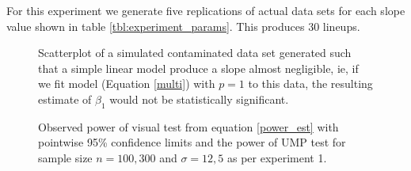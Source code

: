 \documentclass{article}
\begin{document}
For this experiment we generate five replications of actual data sets for each slope value shown in table \ref{tbl:experiment_params}. This produces 30 lineups.

\begin{figure}[hbt]
   \centering
       \caption{Scatterplot of a simulated contaminated data set generated such that a simple linear model produce a slope almost negligible, ie, if we fit model (Equation \eqref{multi}) with $p=1$  to this data, the resulting estimate of $\beta_1$ would not be statistically significant.
}
       \label{fig:cont_dat}
\end{figure}


\begin{figure}[hbtp]
   \centering
       \caption{Observed power of visual test from equation \eqref{power_est} with pointwise 95\% confidence limits and the power of UMP test for sample size $n= 100,300$ and $\sigma = 12,5$ as per experiment 1.}
       \label{fig:power_observed}
\end{figure}
\end{document}
